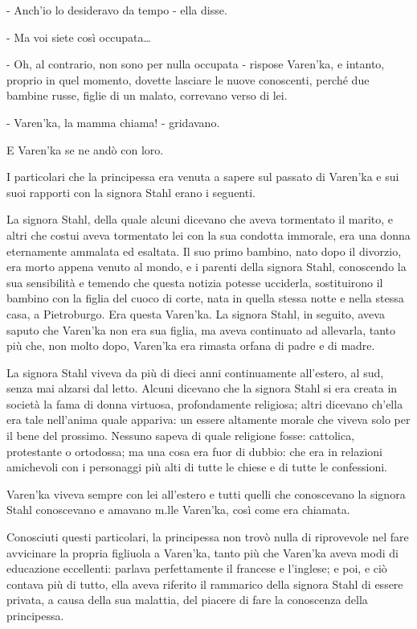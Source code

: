 - Anch'io lo desideravo da tempo - ella disse. 

- Ma voi siete così occupata\ldots{} 

- Oh, al contrario, non sono per nulla occupata - rispose Varen'ka, e intanto, proprio in quel momento, dovette lasciare le nuove conoscenti, perché due bambine russe, figlie di un malato, correvano verso di lei. 

- Varen'ka, la mamma chiama! - gridavano. 

E Varen'ka se ne andò con loro. 

\label{xxxii-1} 

I particolari che la principessa era venuta a sapere sul passato di Varen'ka e sui suoi rapporti con la signora Stahl erano i seguenti. 

La signora Stahl, della quale alcuni dicevano che aveva tormentato il marito, e altri che costui aveva tormentato lei con la sua condotta immorale, era una donna eternamente ammalata ed esaltata. Il suo primo bambino, nato dopo il divorzio, era morto appena venuto al mondo, e i parenti della signora Stahl, conoscendo la sua sensibilità e temendo che questa notizia potesse ucciderla, sostituirono il bambino con la figlia del cuoco di corte, nata in quella stessa notte e nella stessa casa, a Pietroburgo. Era questa Varen'ka. La signora Stahl, in seguito, aveva saputo che Varen'ka non era sua figlia, ma aveva continuato ad allevarla, tanto più che, non molto dopo, Varen'ka era rimasta orfana di padre e di madre. 

La signora Stahl viveva da più di dieci anni continuamente all'estero, al sud, senza mai alzarsi dal letto. Alcuni dicevano che la signora Stahl si era creata in società la fama di donna virtuosa, profondamente religiosa; altri dicevano ch'ella era tale nell'anima quale appariva: un essere altamente morale che viveva solo per il bene del prossimo. Nessuno sapeva di quale religione fosse: cattolica, protestante o ortodossa; ma una cosa era fuor di dubbio: che era in relazioni amichevoli con i personaggi più alti di tutte le chiese e di tutte le confessioni. 

Varen'ka viveva sempre con lei all'estero e tutti quelli che conoscevano la signora Stahl conoscevano e amavano m.lle Varen'ka, così come era chiamata. 

Conosciuti questi particolari, la principessa non trovò nulla di riprovevole nel fare avvicinare la propria figliuola a Varen'ka, tanto più che Varen'ka aveva modi di educazione eccellenti: parlava perfettamente il francese e l'inglese; e poi, e ciò contava più di tutto, ella aveva riferito il rammarico della signora Stahl di essere privata, a causa della sua malattia, del piacere di fare la conoscenza della principessa. 

